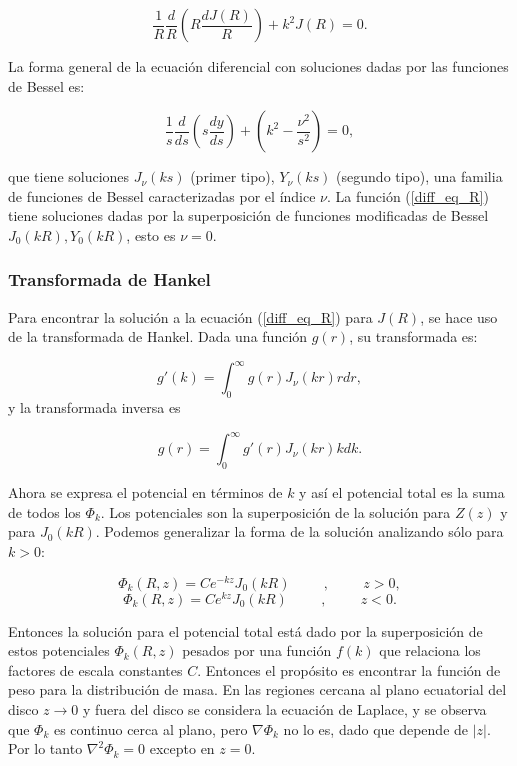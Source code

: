 \begin{appendix}
\begin{equation}
\label{diff_eq_R}
 \frac{1}{R} \frac{d}{R}  \left( R \frac{d J(R)}{R} \right) + k^2 J(R) = 0.
\end{equation}

La forma general de la ecuación diferencial con soluciones dadas por las funciones de Bessel es:

 $$ \frac{1}{s} \frac{d}{ds}  \left( s \frac{d y}{ds} \right) + \left( k^2 - \frac{\nu^2}{s^2} \right) = 0,  $$

que tiene soluciones $J_{\nu}(ks)$ (primer tipo), $Y_{\nu}(ks)$ (segundo tipo), una familia de funciones de Bessel caracterizadas por el índice $\nu$. La función (\ref{diff_eq_R}) tiene soluciones dadas por la superposición de funciones modificadas de Bessel $J_0(kR), Y_0(kR)$, esto es $\nu = 0$.\\

\subsubsection{Transformada de Hankel}

Para encontrar la solución a la ecuación (\ref{diff_eq_R}) para $J(R)$, se hace uso de la transformada de Hankel. Dada una función $g(r)$, su transformada es:

\begin{equation}
\label{Hankel}
   g'(k) = \int_0^{\infty} g(r) J_{\nu}(kr) r dr,
\end{equation}
y la transformada inversa es

\begin{equation}
\label{inverse_Hankel}
   g(r) = \int_0^{\infty} g'(r) J_{\nu}(kr) k dk.
\end{equation}

Ahora se expresa el potencial en términos de $k$ y así el potencial total es la suma de todos los $\Phi_k$. Los potenciales son la superposición de la solución para $Z(z)$ y para $J_0(kR)$. Podemos generalizar la forma de la solución analizando sólo para $k>0$:

$$ \Phi_k(R,z) = Ce^{-kz} J_0(kR)  \hspace{1cm}, \hspace{1cm} z>0, $$
$$ \Phi_k(R,z) = Ce^{kz} J_0(kR)  \hspace{1cm}, \hspace{1cm} z<0. $$

Entonces la solución para el potencial total está dado por la superposición de estos potenciales $\Phi_k(R,z)$ pesados por una función $f(k)$ que relaciona los factores de escala constantes $C$. Entonces el propósito es encontrar la función de peso para la distribución de masa. En las regiones cercana al plano ecuatorial  del disco $z \rightarrow 0$ y fuera del disco se considera la ecuación de Laplace, y se observa que $\Phi_k$ es continuo cerca al plano, pero $\nabla \Phi_k$ no lo es, dado que depende de $|z|$. Por lo tanto $\nabla^2 \Phi_k = 0$ excepto en $z=0$.\\


\end{appendix}
